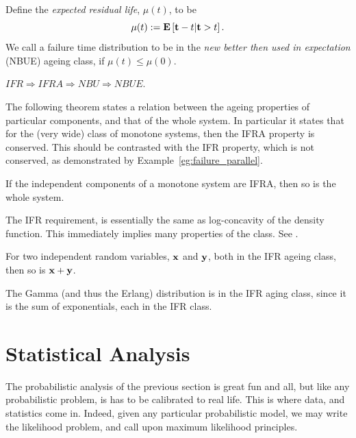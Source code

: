 \begin{definition}[NBUE]
Define the \emph{expected residual life}, $\mu(t)$, to be 
$$\mu(t):= \mathbf{E}\left[ \mathbf{t}-t|\mathbf{t}>t \right].$$
We call a failure time distribution to be in the \emph{new better then used in expectation} (NBUE) ageing class, if 
$\mu(t) \leq \mu(0)$.
\end{definition}


\begin{theorem}
$IFR \Rightarrow IFRA \Rightarrow NBU \Rightarrow NBUE. $
\end{theorem}


The following theorem states a relation between the ageing properties of particular components, and that of the whole system. In particular it states that for the (very wide) class of monotone systems, then the IFRA property is conserved. 
This should be contrasted with the IFR property, which is not conserved, as demonstrated by Example~\ref{eg:failure_parallel}.
\begin{theorem}
\label{thm:ifra_closure}
If the independent components of a monotone system are IFRA, then so is the whole system.
\end{theorem}



\begin{extra}
The IFR requirement, is essentially the same as log-concavity of the density function.
This immediately implies many properties of the class.
See \cite{bagnoli_log-concave_2005}.
\end{extra}



\begin{theorem}
For two independent random variables, $\mathbf{x}$ and $\mathbf{y}$, both in the IFR ageing class, then so is $\mathbf{x}+\mathbf{y}$.
\end{theorem}


\begin{example}
The Gamma (and thus the Erlang) distribution is in the IFR aging class, since it is the sum of exponentials, each in the IFR class.
\end{example}





\section{Statistical Analysis}
The probabilistic analysis of the previous section is great fun and all, but like any probabilistic problem, is has to be calibrated to real life. 
This is where data, and statistics come in.
Indeed, given any particular probabilistic model, we may write the likelihood problem, and call upon maximum likelihood principles.


